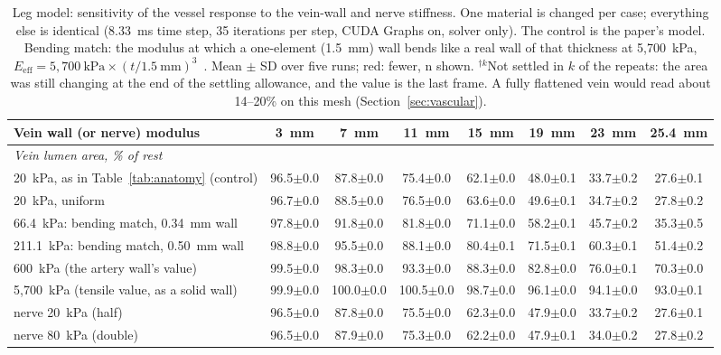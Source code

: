 \begin{table}[t]
\centering
\caption{Leg model: sensitivity of the vessel response to the vein-wall and nerve stiffness. One material is changed per
case; everything else is identical (8.33~ms time step, 35 iterations per step, CUDA Graphs on, solver only). The control
is the paper's model. Bending match: the modulus at which a one-element (1.5~mm) wall bends like a real wall of that
thickness at 5,700~kPa, $E_\mathrm{eff} = 5{,}700~\mathrm{kPa} \times (t/1.5~\mathrm{mm})^3$~\cite{lebahn2025,alibazoner2021}.
Mean $\pm$ SD over five runs; red: fewer, n shown. $^{\dagger k}$Not settled in $k$ of the repeats: the area was still
changing at the end of the settling allowance, and the value is the last frame. A fully flattened vein would read about
14--20\% on this mesh (Section~\ref{sec:vascular}).}
\label{tab:appendix_wall}
\footnotesize
\setlength{\tabcolsep}{3pt}
\begin{tabular}{lccccccc}
\hline
\textbf{Vein wall (or nerve) modulus} & \textbf{3~mm} & \textbf{7~mm} & \textbf{11~mm} & \textbf{15~mm} & \textbf{19~mm} & \textbf{23~mm} & \textbf{25.4~mm} \\
\hline
\multicolumn{8}{l}{\textit{Vein lumen area, \% of rest}} \\
20~kPa, as in Table~\ref{tab:anatomy} (control) & 96.5$\pm$0.0 & 87.8$\pm$0.0 & 75.4$\pm$0.0 & 62.1$\pm$0.0 & 48.0$\pm$0.1 & 33.7$\pm$0.2 & 27.6$\pm$0.1 \\
20~kPa, uniform & 96.7$\pm$0.0 & 88.5$\pm$0.0 & 76.5$\pm$0.0 & 63.6$\pm$0.0 & 49.6$\pm$0.1 & 34.7$\pm$0.2 & 27.8$\pm$0.2 \\
66.4~kPa: bending match, 0.34~mm wall & 97.8$\pm$0.0 & 91.8$\pm$0.0 & 81.8$\pm$0.0 & 71.1$\pm$0.0 & 58.2$\pm$0.1 & 45.7$\pm$0.2 & 35.3$\pm$0.5 \\
211.1~kPa: bending match, 0.50~mm wall & 98.8$\pm$0.0 & 95.5$\pm$0.0 & 88.1$\pm$0.0 & 80.4$\pm$0.1 & 71.5$\pm$0.1 & 60.3$\pm$0.1 & 51.4$\pm$0.2 \\
600~kPa (the artery wall's value) & 99.5$\pm$0.0 & 98.3$\pm$0.0 & 93.3$\pm$0.0 & 88.3$\pm$0.0 & 82.8$\pm$0.0 & 76.0$\pm$0.1 & 70.3$\pm$0.0 \\
5,700~kPa (tensile value, as a solid wall) & 99.9$\pm$0.0 & 100.0$\pm$0.0 & 100.5$\pm$0.0 & 98.7$\pm$0.0 & 96.1$\pm$0.0 & 94.1$\pm$0.0 & 93.0$\pm$0.1 \\
nerve 20~kPa (half) & 96.5$\pm$0.0 & 87.8$\pm$0.0 & 75.5$\pm$0.0 & 62.3$\pm$0.0 & 47.9$\pm$0.0 & 33.7$\pm$0.2 & 27.6$\pm$0.1 \\
nerve 80~kPa (double) & 96.5$\pm$0.0 & 87.9$\pm$0.0 & 75.3$\pm$0.0 & 62.2$\pm$0.0 & 47.9$\pm$0.1 & 34.0$\pm$0.2 & 27.8$\pm$0.2 \\

\end{tabular}
\end{table}
